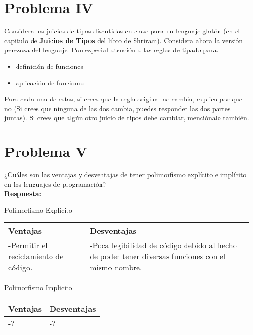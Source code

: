 \documentclass{article}
\begin{document}
\section*{Problema IV}
Considera los juicios de tipos discutidos en clase para un lenguaje glotón
(en el capitulo de \textbf{Juicios de Tipos} del libro de Shriram).
Considera ahora la versión perezosa del lenguaje. Pon especial atención a
las reglas de tipado para:

\begin{itemize}
\item definición de funciones
\item aplicación de funciones
\end{itemize}

Para cada una de estas, si crees que la regla original no cambia, explica por que no
(Si crees que ninguna de las dos cambia, puedes responder las dos partes juntas).
Si crees que algún otro juicio de tipos debe cambiar, menciónalo también.

\section*{Problema V}
¿Cuáles son las ventajas y desventajas de tener polimorfismo explícito e implícito
en los lenguajes de programación?
\\
\textbf{Respuesta: }
\\


\begin{center}
Polimorfismo Explicito
\end{center}
\begin{tabularx}{\textwidth}{X|X}
	  \textbf{Ventajas} & \textbf{Desventajas} \\
	\hline
	-Permitir el reciclamiento de código. & -Poca legibilidad de código debido al hecho de poder tener diversas funciones con el mismo nombre.
\end{tabularx}

\begin{center}
Polimorfismo Implicito
\end{center}
\begin{tabularx}{\textwidth}{X|X}
	  \textbf{Ventajas} & \textbf{Desventajas} \\
	\hline
	-? & -?
\end{tabularx}
\end{document}
